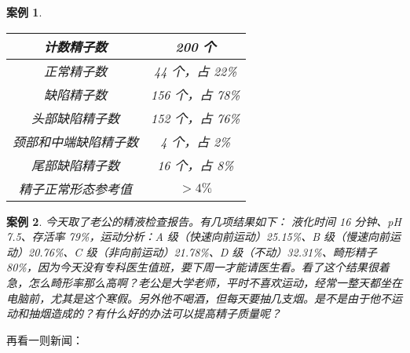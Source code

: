 \documentclass[fontset=founder]{ctexart}
\newtheorem{case}{案例}
\begin{document}
\begin{case}
\begin{enumerate}
\begin{center}
\begin{tabular}{c|c}
                计数精子数      & 200 个        \\ \hline
                正常精子数      & 44 个，占 22\%  \\ \hline
                缺陷精子数      & 156 个，占 78\% \\ \hline
                头部缺陷精子数    & 152 个，占 76\% \\ \hline
                颈部和中端缺陷精子数 & 4 个，占 2\%    \\ \hline
                尾部缺陷精子数    & 16 个，占 8\%   \\ \hline
                精子正常形态参考值  & $> 4 \%$
            \end{tabular}
        \end{center}
    \end{enumerate}
\end{case}

\begin{case}
    今天取了老公的精液检查报告。有几项结果如下： 液化时间 16 分钟、pH 7.5、存活率 79\%，运动分析：A 级（快速向前运动）25.15\%、B 级（慢速向前运动）20.76\%、C 级（非向前运动）21.78\%、D 级（不动）32.31\%、畸形精子 80\%，因为今天没有专科医生值班，要下周一才能请医生看。看了这个结果很着急，怎么畸形率那么高啊？老公是大学老师，平时不喜欢运动，经常一整天都坐在电脑前，尤其是这个寒假。另外他不喝酒，但每天要抽几支烟。是不是由于他不运动和抽烟造成的？有什么好的办法可以提高精子质量呢？
\end{case}

再看一则新闻：
\end{document}

